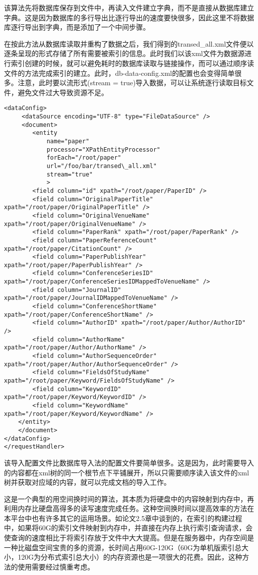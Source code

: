 该算法先将数据库保存到文件中，再读入文件建立字典，而不是直接从数据库建立字典。这是因为数据库的多行导出比逐行导出的速度要快很多，因此这里不将数据库逐行导出到字典，而是添加了一个中间步骤。

在按此方法从数据库读取并重构了数据之后，我们得到的transed\_all.xml文件便以逐条呈现的形式存储了所有需要被索引的信息。此时我们以该xml文件为数据源进行索引创建的时候，就可以避免耗时的数据库读取与链接操作，而可以通过顺序读文件的方法完成索引的建立。此时，db-data-config.xml的配置也会变得简单很多。注意，此时要以流形式(stream = true)导入数据，可以让系统逐行读取目标文件，避免文件过大导致资源不足。

\begin{lstlisting}[caption={从文件导入索引的db-data-config.xml}, label=filetoindex, escapeinside="", numbers=none]
<dataConfig>
	 <dataSource encoding="UTF-8" type="FileDataSource" />
	 <document>
	    <entity
	        name="paper"
			processor="XPathEntityProcessor"
			forEach="/root/paper"
			url="/foo/bar/transed\_all.xml"
			stream="true"
			>
		<field column="id" xpath="/root/paper/PaperID" />
		<field column="OriginalPaperTitle" xpath="/root/paper/OriginalPaperTitle" />
		<field column="OriginalVenueName" xpath="/root/paper/OriginalVenueName" />
		<field column="PaperRank" xpath="/root/paper/PaperRank" />
		<field column="PaperReferenceCount" xpath="/root/paper/CitationCount" />
		<field column="PaperPublishYear" xpath="/root/paper/PaperPublishYear" />
		<field column="ConferenceSeriesID" xpath="/root/paper/ConferenceSeriesIDMappedToVenueName" />
		<field column="JournalID" xpath="/root/paper/JournalIDMappedToVenueName" />
		<field column="ConferenceShortName" xpath="/root/paper/ConferenceShortName" />
		<field column="AuthorID" xpath="/root/paper/Author/AuthorID" />
		<field column="AuthorName" xpath="/root/paper/Author/AuthorName" />
		<field column="AuthorSequenceOrder" xpath="/root/paper/Author/AuthorSequenceOrder" />
		<field column="FieldsOfStudyName" xpath="/root/paper/Keyword/FieldsOfStudyName" />
		<field column="KeywordID" xpath="/root/paper/Keyword/KeywordID" />
		<field column="KeywordName" xpath="/root/paper/Keyword/KeywordName" />
    </entity>
    </document>
</dataConfig>
</requestHandler>
\end{lstlisting}

该导入配置文件比数据库导入法的配置文件要简单很多。这是因为，此时需要导入的内容都在xml树的同一个根节点下平铺展开，所以只需要顺序读入该文件的xml树并获取对应域的内容，就可以完成文档的导入工作。

这是一个典型的用空间换时间的算法，其本质为将硬盘中的内容映射到内存中，再利用内存比硬盘高得多的读写速度完成任务。这种空间换时间以提高效率的方法在本平台中也有许多其它的运用场景。如论文2.5章中谈到的，在索引的构建过程中，如果将60G的索引文件映射到内存中，并直接在内存上执行索引查询请求，会使查询的速度相比于将索引存放于文件中大大提高。但是在服务器中，内存空间是一种比磁盘空间宝贵的多的资源，长时间占用60G-120G（60G为单机版索引总大小，120G为分布式索引总大小）的内存资源也是一项很大的花费。因此，这种方法的使用需要经过慎重考虑。

